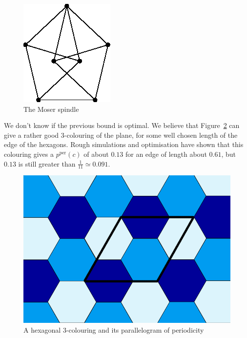 \documentclass[a4paper,11pt]{article}
\theoremstyle{definition}
\theoremstyle{remark}
\newcommand{\pper}{p^{\mathrm{per}}}
\begin{document}
\begin{figure}[h]
\center
\includegraphics[scale=0.4]{T.png}
\caption{\label{color} The Moser spindle}
\end{figure}

We don't know if the previous bound is optimal. We believe that Figure~\ref{trois} 
can give a rather good $3$-colouring of the plane, for some well chosen length 
of the edge of the hexagons. Rough simulations and optimisation have shown that 
this colouring gives a $\pper(c)$ of about $0.13$ for an edge of length about 
$0.61$, but $0.13$ is still greater than $\frac{1}{11} \simeq 0.091$.

\begin{figure}[h]
\center
\includegraphics[scale=0.5]{trois.png}
\caption{\label{trois} A hexagonal $3$-colouring and its parallelogram of periodicity}
\end{figure}
\end{document}
